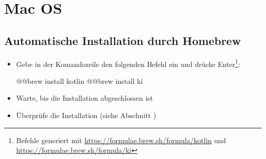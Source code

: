 \section*{Mac OS}
\subsection*{Automatische Installation durch Homebrew}
\begin{itemize}
    \item Gebe in der Komandozeile den folgenden Befehl ein und drücke Enter\footnote{Befehle generiert mit \url{https://formulae.brew.sh/formula/kotlin} und \url{https://formulae.brew.sh/formula/ki}}:
\begin{commandshell}
@\shellprefix{}@brew install kotlin
@\shellprefix{}@brew install ki
\end{commandshell}
    \item Warte, bis die Installation abgeschlossen ist
    \item Überprüfe die Installation (siehe Abschnitt )
\end{itemize}

